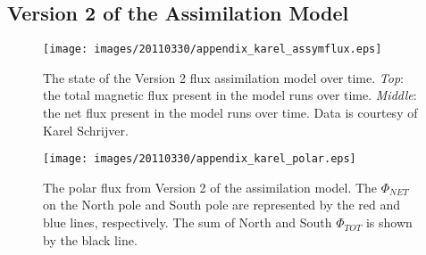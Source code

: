 \documentclass[namedreferences]{solarphysics}
\begin{document}
\begin{article}
   

%

  


\appendix
\section{Version 2 of the Assimilation Model}

\begin{figure}[!t]
\begin{center}
\texttt{[image: images/20110330/appendix\_karel\_assymflux.eps]}
\end{center}
\caption{The state of the Version 2 flux assimilation model over time. \emph{Top}: the total magnetic flux present in the model runs over time. \emph{Middle}: the net flux present in the model runs over time. Data is courtesy of Karel Schrijver.}
\label{plot_assim}
\end{figure}

\begin{figure}[!t]
\begin{center}
\texttt{[image: images/20110330/appendix\_karel\_polar.eps]}
\end{center}
\caption{The polar flux from Version 2 of the assimilation model. The $\Phi_{NET}$ on the North pole and South pole are represented by the red and blue lines, respectively. The sum of North and South $\Phi_{TOT}$ is shown by the black line.}
\label{plot_assim_poles}
\end{figure}


\end{article}
\end{document}
